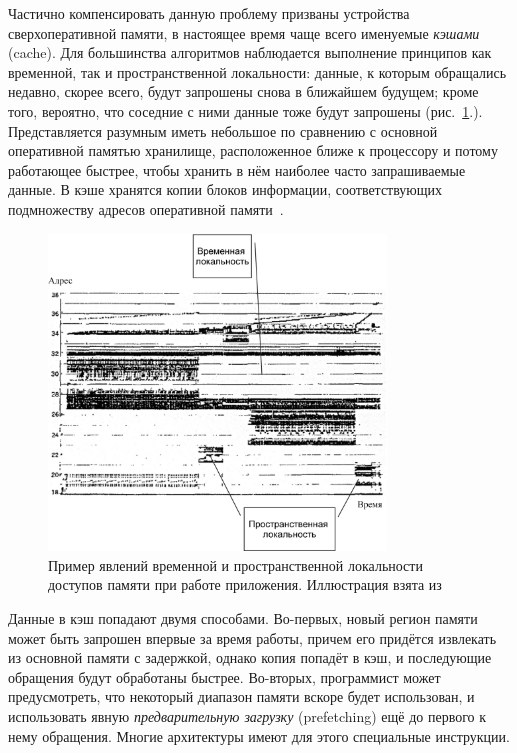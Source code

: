 Частично компенсировать данную проблему призваны устройства сверхоперативной памяти, в настоящее время чаще всего именуемые \textit{кэшами} (\abbr cache). Для большинства алгоритмов наблюдается выполнение принципов как временной, так  и пространственной  локальности: данные, к которым обращались недавно, скорее всего, будут запрошены снова в ближайшем будущем; кроме того, вероятно, что соседние с ними данные тоже будут запрошены (рис.~\ref{fig:locality}.). Представляется разумным иметь небольшое по сравнению с основной оперативной памятью хранилище, расположенное ближе к процессору и потому работающее быстрее, чтобы хранить в нём наиболее часто запрашиваемые данные. В кэше хранятся копии блоков информации, соответствующих подмножеству адресов оперативной памяти~\cite{ulrich-cpumemory, ulrich-cpumemory-rus}.

\begin{figure}[htb]
    \centering
    \includegraphics[width=0.80\textwidth]{./locality-crop.pdf}
    \caption[Пример явлений временной и пространственной локальности]{Пример явлений временной и пространственной локальности доступов памяти при работе приложения. Иллюстрация взята из~\cite{DBLP:journals/ibmsj/HatfieldG71}}
    \label{fig:locality}
\end{figure}


Данные в кэш попадают двумя способами. Во-первых, новый регион памяти может быть запрошен впервые за время работы, причем его придётся извлекать из основной памяти с задержкой, однако копия попадёт в кэш, и последующие обращения будут обработаны быстрее. Во-вторых, программист может предусмотреть, что некоторый диапазон памяти вскоре будет использован, и использовать явную \textit{предварительную загрузку} (\abbr prefetching) ещё до первого к нему обращения. Многие архитектуры имеют для этого специальные инструкции.

